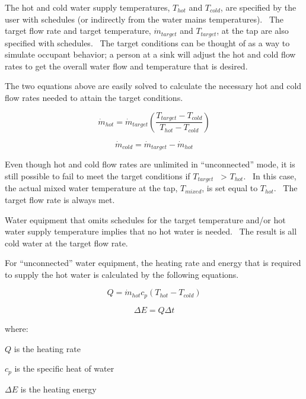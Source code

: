 The hot and cold water supply temperatures, \({T_{hot}}\) and \({T_{cold}}\), are specified by the user with schedules (or indirectly from the water mains temperatures).~ The target flow rate and target temperature, \({\dot m_{target}}\) and \({T_{target}}\), at the tap are also specified with schedules.~ The target conditions can be thought of as a way to simulate occupant behavior; a person at a sink will adjust the hot and cold flow rates to get the overall water flow and temperature that is desired.

The two equations above are easily solved to calculate the necessary hot and cold flow rates needed to attain the target conditions.

\begin{equation}
{\dot m_{hot}} = {\dot m_{target}}\left( {\frac{{{T_{target}} - {T_{cold}}}}{{{T_{hot}} - {T_{cold}}}}} \right)
\end{equation}

\begin{equation}
{\dot m_{cold}} = {\dot m_{target}} - {\dot m_{hot}}
\end{equation}

Even though hot and cold flow rates are unlimited in ``unconnected'' mode, it is still possible to fail to meet the target conditions if \({T_{target}}\) ~\textgreater{} \({T_{hot}}\).~ In this case, the actual mixed water temperature at the tap, \({T_{mixed}}\), is set equal to \({T_{hot}}\).~ The target flow rate is always met.

Water equipment that omits schedules for the target temperature and/or hot water supply temperature implies that no hot water is needed.~ The result is all cold water at the target flow rate.

For ``unconnected'' water equipment, the heating rate and energy that is required to supply the hot water is calculated by the following equations.

\begin{equation}
Q = {\dot m_{hot}}{c_p}\left( {{T_{hot}} - {T_{cold}}} \right)
\end{equation}

\begin{equation}
\Delta E = Q\Delta t
\end{equation}

where:

\(Q\) is the heating rate

\({c_p}\) is the specific heat of water

\(\Delta E\) is the heating energy

